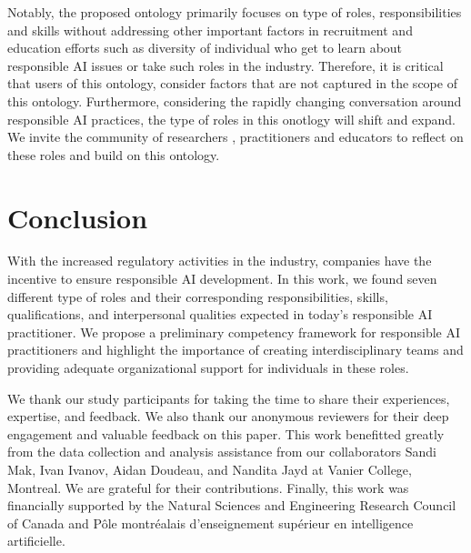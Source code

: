 \documentclass[sigconf]{acmart}
\begin{document}
 Notably, the proposed ontology primarily focuses on type of roles, responsibilities and skills without addressing other important factors in recruitment and education efforts such as diversity of individual who get to learn about responsible AI issues or take such roles in the industry. Therefore, it is critical that users of this ontology, consider factors that are not captured in the scope of this ontology. Furthermore, considering the rapidly changing conversation around responsible AI practices, the type of roles in this onotlogy will shift and expand. We invite the community of researchers , practitioners and educators to reflect on these roles and build on this ontology.


\section{Conclusion}

With the increased regulatory activities in the industry, companies have the incentive to ensure responsible AI development. In this work, we found seven different type of roles and their corresponding responsibilities, skills, qualifications, and interpersonal qualities expected in today's responsible AI practitioner. We propose a preliminary competency framework for responsible AI practitioners and highlight the importance of creating interdisciplinary teams and providing adequate organizational support for individuals in these roles. %


\begin{acks}
We thank our study participants for taking the time to share their experiences, expertise, and feedback. We also thank our anonymous reviewers for their deep engagement and valuable feedback on this paper. This work benefitted greatly from the data collection and analysis assistance from our collaborators Sandi Mak, Ivan Ivanov, Aidan Doudeau, and Nandita Jayd at Vanier College, Montreal. We are grateful for their contributions. Finally, this work was financially supported by the Natural Sciences and Engineering Research Council of Canada and Pôle montréalais d’enseignement supérieur en intelligence artificielle. 
\end{acks}



\begin{appendices}

\end{appendices}
\end{document}
